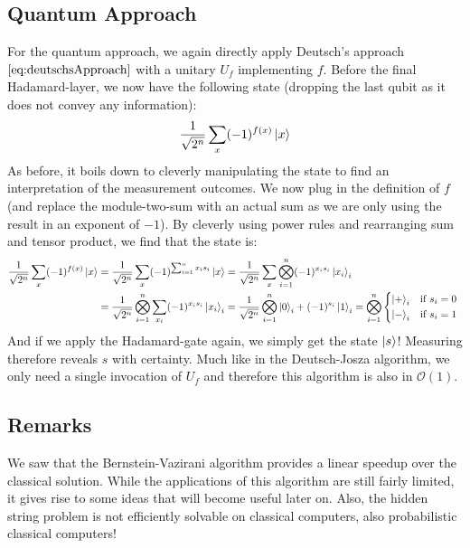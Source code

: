 		\subsection{Quantum Approach}
			For the quantum approach, we again directly apply Deutsch's approach \(\eqref{eq:deutschsApproach}\) with a unitary \(U_f\) implementing \(f\). Before the final Hadamard-layer, we now have the following state (dropping the last qubit as it does not convey any information):
			\begin{equation}
				\frac{1}{\sqrt{2^n}} \sum_x (-1)^{f(x)} \ket{x}  \label{eq:bernsteinVazirani1}
			\end{equation}
			As before, it boils down to cleverly manipulating the state to find an interpretation of the measurement outcomes. We now plug in the definition of \(f\) (and replace the module-two-sum with an actual sum as we are only using the result in an exponent of \(-1\)). By cleverly using power rules and rearranging sum and tensor product, we find that the state is:
			\begin{align}
				\frac{1}{\sqrt{2^n}} \sum_x (-1)^{f(x)} \ket{x}
				 & = \frac{1}{\sqrt{2^n}} \sum_x (-1)^{\sum_{i = 1}^{n} x_i s_i} \ket{x}
				= \frac{1}{\sqrt{2^n}} \sum_x \bigotimes_{i = 1}^{n} (-1)^{x_i s_i} \ket{x_i}_i        \\
				 & = \frac{1}{\sqrt{2^n}} \bigotimes_{i = 1}^{n} \sum_{x_i} (-1)^{x_i s_i} \ket{x_i}_i
				= \frac{1}{\sqrt{2^n}} \bigotimes_{i = 1}^{n} \ket{0}_i + (-1)^{s_i} \ket{1}_i
				= \bigotimes_{i = 1}^{n} \begin{cases*} \ket{+}_i & if \( s_i = 0 \) \\ \ket{-}_i & if \( s_i = 1 \) \end{cases*}
			\end{align}
			And if we apply the Hadamard-gate again, we simply get the state \(\ket{s}\)! Measuring therefore reveals \(s\) with certainty. Much like in the Deutsch-Josza algorithm, we only need a single invocation of \(U_f\) and therefore this algorithm is also in \(\mathcal{O}(1)\).

		\subsection{Remarks}
			We saw that the Bernstein-Vazirani algorithm provides a linear speedup over the classical solution. While the applications of this algorithm are still fairly limited, it gives rise to some ideas that will become useful later on. Also, the hidden string problem is not efficiently solvable on classical computers, also probabilistic classical computers!


